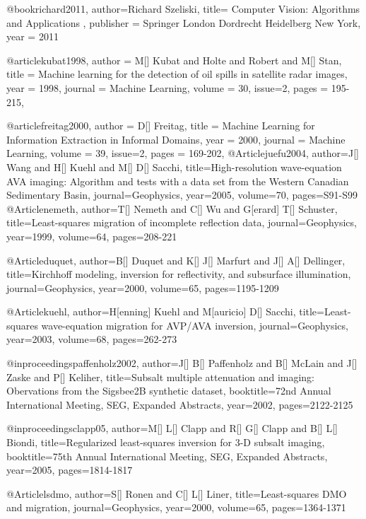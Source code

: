@book{richard2011,
  author={Richard Szeliski},
  title={ Computer Vision: Algorithms and Applications },
  publisher = 	 {Springer London Dordrecht Heidelberg New York},
  year = 	 2011
}

@article{kubat1998,
author = {M[] Kubat and Holte and Robert and M[] Stan},
title = {Machine learning for the detection of oil spills in satellite radar images},
year = {1998},
journal = {Machine Learning},
volume = {30},
issue=2,
pages = {195-215},
}

@article{freitag2000,
author = {D[] Freitag},
title = {Machine Learning for Information Extraction in Informal Domains},
year = {2000},
journal = {Machine Learning},
volume = {39},
issue=2,
pages = {169-202},
}
@Article{juefu2004,
	author={J[] Wang and H[] Kuehl and M[] D[] Sacchi},
	title={High-resolution wave-equation {AVA} imaging: {A}lgorithm and tests with a data set from the {W}estern {C}anadian {S}edimentary {B}asin},
	journal={Geophysics},
	year=2005,
	volume=70,
	pages={S91-S99}
}
@Article{nemeth,
	author={T[] Nemeth and C[] Wu and G[erard] T[] Schuster},
	title={Least-squares migration of incomplete reflection data},
	journal={Geophysics},
	year=1999,
	volume=64,
	pages={208-221}
}

@Article{duquet,
	author={B[] Duquet and K[] J[] Marfurt and J[] A[] Dellinger},
	title={Kirchhoff modeling, inversion for reflectivity, and subsurface illumination},
	journal={Geophysics},
	year=2000,
	volume=65,
	pages={1195-1209}
}

@Article{kuehl,
	author={H[enning] Kuehl and M[auricio] D[] Sacchi},
	title={Least-squares wave-equation migration for {AVP/AVA} inversion},
	journal={Geophysics},
	year=2003,
	volume=68,
	pages={262-273}
}

@inproceedings{paffenholz2002,
	author={J[] B[] Paffenholz and B[] McLain and J[] Zaske and P[] Keliher},
	title={Subsalt multiple attenuation and imaging: Obervations from the {Sigsbee2B} synthetic dataset},
	booktitle={72nd Annual International Meeting, SEG, Expanded Abstracts},
	year=2002,
	pages={2122-2125}
}

@inproceedings{clapp05,
	author={M[] L[] Clapp and R[] G[] Clapp and B[] L[] Biondi},
    title={Regularized least-squares inversion for 3-{D} subsalt imaging},
	booktitle={75th Annual International Meeting, SEG, Expanded Abstracts},
	year=2005,
	pages={1814-1817}
}

@Article{lsdmo,
	author={S[] Ronen and C[] L[] Liner},
	title={Least-squares {DMO} and migration},
	journal={Geophysics},
	year=2000,
	volume=65,
	pages={1364-1371}
}

